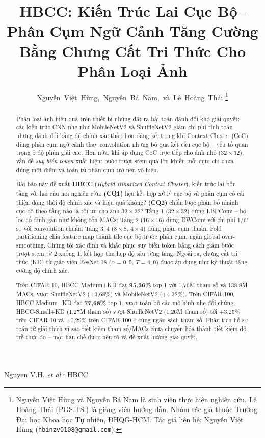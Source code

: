 \documentclass[journal]{IEEEtran}
\begin{document}
\title{HBCC: Kiến Trúc Lai Cục Bộ--Phân Cụm Ngữ Cảnh
  Tăng Cường Bằng Chưng Cất Tri Thức Cho Phân Loại Ảnh}

\author{Nguyễn~Việt~Hùng,~Nguyễn~Bá~Nam,~và~Lê~Hoàng~Thái%
  \thanks{Nguyễn Việt Hùng và Nguyễn Bá Nam là
          sinh viên thực hiện nghiên cứu.
          Lê Hoàng Thái (PGS.TS.) là giảng viên hướng dẫn.
          Nhóm tác giả thuộc Trường Đại học
          Khoa học Tự nhiên, ĐHQG-HCM.
          Tác giả liên hệ: Nguyễn Việt Hùng
          (\texttt{hbinzv0108@gmail.com}).}}

%
         {Nguyen V.H. \texorpdfstring{\textit{et al.}}{et al.}: HBCC}

\maketitle

\begin{abstract}
Phân loại ảnh hiệu quả trên thiết bị nhúng đặt ra bài toán đánh đổi
khó giải quyết: các kiến trúc CNN nhẹ như MobileNetV2 và ShuffleNetV2
giảm chi phí tính toán nhưng đánh đổi bằng độ chính xác thấp hơn
đáng kể, trong khi Context Cluster (CoC) dùng phân cụm ngữ cảnh thay
convolution nhưng bỏ qua kết cấu cục bộ -- yếu tố quan trọng ở độ
phân giải cao. Hơn nữa, khi áp dụng CoC trực tiếp cho ảnh nhỏ
($32\!\times\!32$), vấn đề \textit{suy biến token} xuất hiện: bước
trượt stem quá lớn khiến mỗi cụm chỉ chứa đúng một điểm và toán tử
phân cụm trở nên vô hiệu.

Bài báo này đề xuất \textbf{HBCC} (\textit{Hybrid Binarized Context
Cluster}), kiến trúc lai bốn tầng với hai câu hỏi nghiên cứu:
\textbf{(CQ1)} liệu kết hợp xử lý cục bộ và phân cụm có cải thiện
đồng thời độ chính xác và hiệu quả không? \textbf{(CQ2)} chiến lược
phân bổ nhánh cục bộ theo tầng nào là tối ưu cho ảnh $32\!\times\!32$?
Tầng 1 ($32\!\times\!32$) dùng LBPConv -- bộ lọc cố định gần như
không tốn MACs; Tầng 2 ($16\!\times\!16$) dùng DWConv với chi phí
$1/C$ so với convolution chuẩn; Tầng 3--4 ($8\!\times\!8$,
$4\!\times\!4$) dùng phân cụm thuần. Fold partitioning chia feature
map thành tile cục bộ trước phân cụm, ngăn global over-smoothing.
Chúng tôi xác định và khắc phục suy biến token bằng cách giảm bước
trượt stem từ 2 xuống 1, kết hợp thu hẹp độ sâu từng tầng. Ngoài ra,
chưng cất tri thức (KD) từ giáo viên ResNet-18 ($\alpha{=}0{,}5$,
$T{=}4{,}0$) được áp dụng như kỹ thuật tăng cường độ chính xác.

Trên CIFAR-10, HBCC-Medium+KD đạt \textbf{95,36\%} top-1 với 1,76M
tham số và 138,8M MACs, vượt ShuffleNetV2 ($+$3,68\%) và MobileNetV2
($+$4,32\%). Trên CIFAR-100, HBCC-Medium+KD đạt \textbf{77,68\%}
top-1, vượt toàn bộ các mô hình nhẹ đối chứng. HBCC-Small+KD
(1,27M tham số) vượt ShuffleNetV2 (1,26M tham số) tới $+$3,25\%
trên CIFAR-10 và $+$0,29\% trên CIFAR-100 ở cùng ngân sách tham số.
Phân tích hồ sơ toán tử giải thích vì sao tiết kiệm tham số/MACs
chưa chuyển hóa thành tiết kiệm độ trễ thực đo -- một hạn chế được
nêu rõ và đề xuất hướng giải quyết.
\end{abstract}
\end{document}
